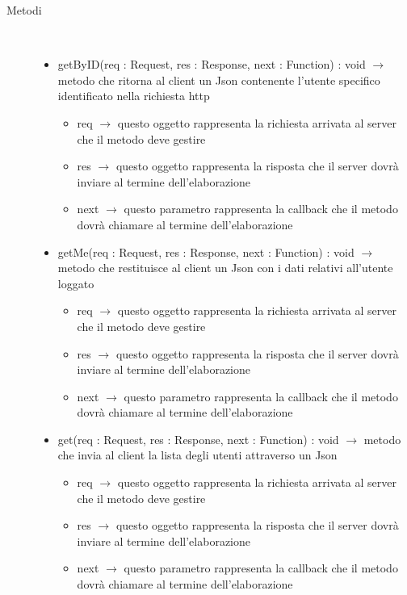 \begin{description}
\item[Metodi] \hfill \\
\vspace{-7mm}
\begin{itemize}
	\item getByID(req : Request, res : Response, next : Function) : void $\rightarrow$ metodo che ritorna al client un Json contenente l'utente specifico identificato nella richiesta http\begin{itemize}
		\item req $\rightarrow$ questo oggetto rappresenta la richiesta arrivata al server che il metodo deve gestire
		\item res $\rightarrow$ questo oggetto rappresenta la risposta che il server dovrà inviare al termine dell'elaborazione
		\item next $\rightarrow$ questo parametro rappresenta la callback che il metodo dovrà chiamare al termine dell'elaborazione
	\end{itemize}
	
	\item getMe(req : Request, res : Response, next : Function) : void $\rightarrow$ metodo che restituisce al client un Json con i dati relativi all'utente loggato\begin{itemize}
		\item req $\rightarrow$ questo oggetto rappresenta la richiesta arrivata al server che il metodo deve gestire
		\item res $\rightarrow$ questo oggetto rappresenta la risposta che il server dovrà inviare al termine dell'elaborazione
		\item next $\rightarrow$ questo parametro rappresenta la callback che il metodo dovrà chiamare al termine dell'elaborazione
	\end{itemize}
	
	\item get(req : Request, res : Response, next : Function) : void $\rightarrow$ metodo che invia al client la lista degli utenti attraverso un Json\begin{itemize}
		\item req $\rightarrow$ questo oggetto rappresenta la richiesta arrivata al server che il metodo deve gestire
		\item res $\rightarrow$ questo oggetto rappresenta la risposta che il server dovrà inviare al termine dell'elaborazione
		\item next $\rightarrow$ questo parametro rappresenta la callback che il metodo dovrà chiamare al termine dell'elaborazione
	\end{itemize}
	

\end{itemize}
\end{description}
